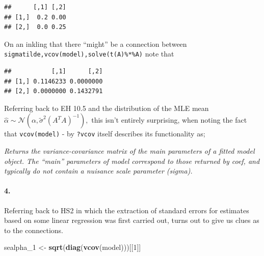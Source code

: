 \documentclass[
]{article}
\newenvironment{Shaded}{\begin{snugshade}}{\end{snugshade}}
\newcommand{\CommentTok}[1]{\textcolor[rgb]{0.56,0.35,0.01}{\textit{#1}}}
\newcommand{\DecValTok}[1]{\textcolor[rgb]{0.00,0.00,0.81}{#1}}
\newcommand{\KeywordTok}[1]{\textcolor[rgb]{0.13,0.29,0.53}{\textbf{#1}}}
\newcommand{\NormalTok}[1]{#1}
\newcommand{\OperatorTok}[1]{\textcolor[rgb]{0.81,0.36,0.00}{\textbf{#1}}}
\newcommand{\StringTok}[1]{\textcolor[rgb]{0.31,0.60,0.02}{#1}}
\begin{document}
\begin{verbatim}
##      [,1] [,2]
## [1,]  0.2 0.00
## [2,]  0.0 0.25
\end{verbatim}

On an inkling that there ``might'' be a connection between
\texttt{sigmatilde,vcov(model),solve(t(A)\%*\%A)} note that

\begin{Shaded}
\end{Shaded}

\begin{verbatim}
##           [,1]      [,2]
## [1,] 0.1146233 0.0000000
## [2,] 0.0000000 0.1432791
\end{verbatim}

Referring back to EH 10.5 and the distribution of the MLE mean
\(\hat\alpha\sim\mathcal{N}\left({{\alpha},{\tilde\sigma^2\left({A^TA}\right)^{-1}}}\right),\)
this isn't entirely surprising, when noting the fact that
\texttt{vcov(model)} - by \texttt{?vcov} itself describes its
functionality as;

\emph{Returns the variance-covariance matrix of the main parameters of a
fitted model object. The ``main'' parameters of model correspond to
those returned by coef, and typically do not contain a nuisance scale
parameter (sigma).}

\hypertarget{section-47}{%
\paragraph{\texorpdfstring{\textbf{4.}}{4.}}\label{section-47}}

Referring back to HS2 in which the extraction of standard errors for
estimates based on some linear regression was first carried out, turns
out to give us clues as to the connections.

\begin{Shaded}
\begin{Highlighting}[]
\NormalTok{sealpha_}\DecValTok{1}\NormalTok{ <-}\StringTok{ }\KeywordTok{sqrt}\NormalTok{(}\KeywordTok{diag}\NormalTok{(}\KeywordTok{vcov}\NormalTok{(model)))[[}\DecValTok{1}\NormalTok{]]}
\end{Highlighting}
\end{Shaded}
\end{document}
